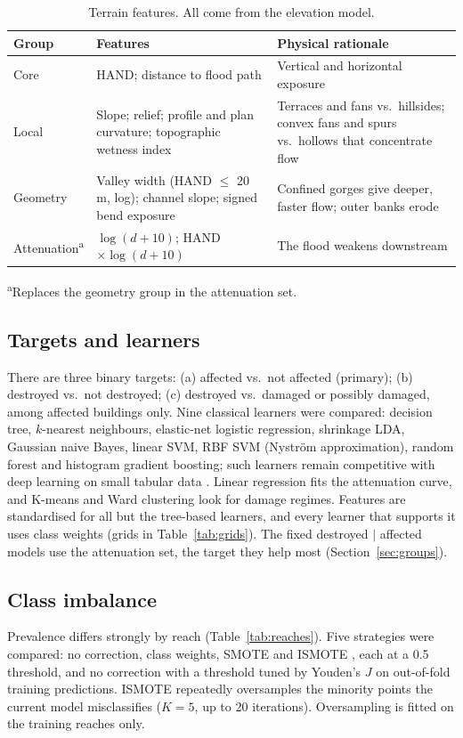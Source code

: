\documentclass[journal,a4paper]{IEEEtran}
\begin{document}
\begin{table}[t]
\centering\footnotesize
\setlength{\tabcolsep}{3pt}
\caption{Terrain features. All come from the elevation model.}\label{tab:features}
\begin{tabularx}{\columnwidth}{@{}L{1.4cm}L{2.7cm}Y@{}}
\toprule
\textbf{Group} & \textbf{Features} & \textbf{Physical rationale}\\
\midrule
Core & HAND; distance to flood path & Vertical and horizontal exposure\\
Local & Slope; relief; profile and plan curvature; topographic wetness index & Terraces and fans vs.\ hillsides; convex fans and spurs vs.\ hollows that concentrate flow\\
Geometry & Valley width (HAND $\leq$ 20\,m, log); channel slope; signed bend exposure & Confined gorges give deeper, faster flow; outer banks erode\\
Attenu\-ation\textsuperscript{a} & $\log(d+10)$; HAND\,$\times\log(d+10)$ & The flood weakens downstream\\
\bottomrule
\end{tabularx}

{\scriptsize \textsuperscript{a}Replaces the geometry group in the attenuation set.}
\end{table}

\subsection{Targets and learners}
There are three binary targets: (a) affected vs.\ not affected (primary); (b) destroyed vs.\ not destroyed; (c) destroyed vs.\ damaged or possibly damaged, among affected buildings only. Nine classical learners were compared: decision tree, $k$-nearest neighbours, elastic-net logistic regression, shrinkage LDA, Gaussian naive Bayes, linear SVM, RBF SVM (Nystr\"om approximation), random forest and histogram gradient boosting; such learners remain competitive with deep learning on small tabular data \citep{grinsztajn2022}. Linear regression fits the attenuation curve, and K-means and Ward clustering look for damage regimes. Features are standardised for all but the tree-based learners, and every learner that supports it uses class weights (grids in Table~\ref{tab:grids}). The fixed destroyed $\mid$ affected models use the attenuation set, the target they help most (Section~\ref{sec:groups}).

\subsection{Class imbalance}
Prevalence differs strongly by reach (Table~\ref{tab:reaches}). Five strategies were compared: no correction, class weights, SMOTE \citep{elreedy2023} and ISMOTE \citep{song2024}, each at a 0.5 threshold, and no correction with a threshold tuned by Youden's $J$ on out-of-fold training predictions. ISMOTE repeatedly oversamples the minority points the current model misclassifies ($K = 5$, up to 20 iterations). Oversampling is fitted on the training reaches only.
\end{document}

